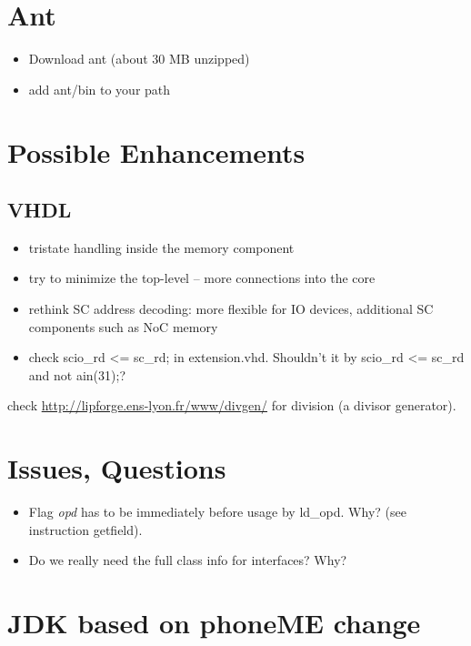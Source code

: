 \documentclass[a4paper,12pt]{scrartcl}
\newcommand{\code}[1]{{\textsf{#1}}}
\begin{document}
\section{Ant}

\begin{itemize}
    \item Download ant (about 30 MB unzipped)
    \item add ant/bin to your path
\end{itemize}

\section{Possible Enhancements}

\subsection{VHDL}

\begin{itemize}
    \item tristate handling inside the memory component
    \item try to minimize the top-level -- more connections into the
    core
    \item rethink SC address decoding: more flexible for IO devices,
    additional SC components such as NoC memory
    \item check \code{scio\_rd <= sc\_rd;} in \code{extension.vhd}.
    Shouldn't it by \code{scio\_rd <= sc\_rd and not ain(31);}?
\end{itemize}

check \url{http://lipforge.ens-lyon.fr/www/divgen/} for division (a
divisor generator).

\section{Issues, Questions}

\begin{itemize}
    \item Flag \emph{opd} has to be immediately before usage by ld\_opd.
    Why? (see instruction getfield).
    \item Do we really need the full class info for interfaces? Why?
\end{itemize}

\section{JDK based on phoneME change}
\end{document}
